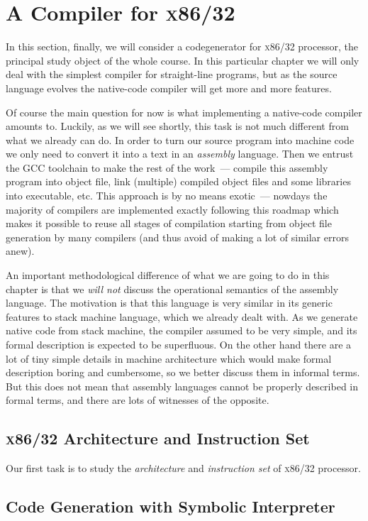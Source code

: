 \chapter{A Compiler for \textsc{x86/32}}

In this section, finally, we will consider a codegenerator for \textsc{x86/32} processor, the principal study object of the whole course. In this particular chapter we will only deal with the simplest compiler for straight-line programs, but as the source language evolves the native-code compiler will get more and more features.

Of course the main question for now is what implementing a native-code compiler amounts to. Luckily, as we will see shortly, this task is not much different from what we already can do. In order to turn our source program into machine code we only need to convert it into a text in an \emph{assembly} language. Then we entrust the \textsc{GCC} toolchain to make the rest of the work~--- compile this assembly program into object file, link (multiple) compiled object files and some libraries into executable, etc. This approach is by no means exotic~--- nowdays the majority of compilers are implemented exactly following this roadmap which makes it possible to reuse all stages of compilation starting from object file generation by many compilers (and thus avoid of making a lot of similar errors anew).

An important methodological difference of what we are going to do in this chapter is that we \emph{will not} discuss the operational semantics of the assembly language. The motivation is that this language is very similar in its generic features to stack machine language, which we already dealt with. As we generate native code from stack machine, the compiler assumed to be very simple, and its formal description is expected to be superfluous. On the other hand there are a lot of tiny simple details in machine architecture which would make formal description boring and cumbersome, so we better discuss them in informal terms. But this does not mean that assembly languages cannot be properly described in formal terms, and there are lots of witnesses of the opposite.

\section{\textsc{x86/32} Architecture and Instruction Set}

Our first task is to study the \emph{architecture} and \emph{instruction set} of \textsc{x86/32} processor.  

\section{Code Generation with Symbolic Interpreter}

\section{}


